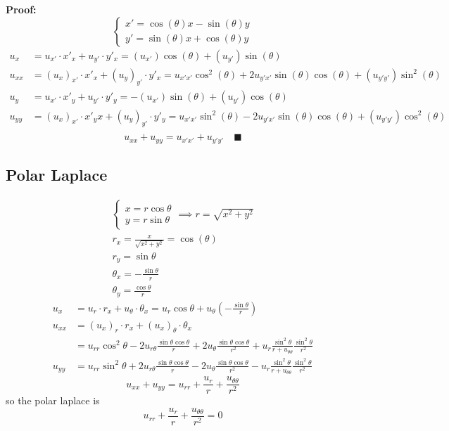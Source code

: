 \documentclass[10pt]{article}
\begin{document}
\textbf{Proof:} 
\[\begin{cases}
    x' = \cos(\theta)x - \sin(\theta) y\\
    y' = \sin(\theta)x + \cos(\theta)y
\end{cases}\]
\begin{align*}
    u_x &= u_{x'} \cdot x'_x + u_{y'} \cdot y'_x = (u_{x'})\cos(\theta) + (u_{y'})\sin(\theta)\\
    u_{xx} &= (u_x)_{x'}\cdot x'_x + (u_y)_{y'} \cdot y'_x = u_{x'x'}\cos^2(\theta) +2u_{y'x'}\sin(\theta)\cos(\theta) + (u_{y'y'})\sin^2(\theta)\\
    u_y &= u_{x'} \cdot x'_y + u_{y'} \cdot y'_y = -(u_{x'})\sin(\theta) + (u_{y'})\cos(\theta)\\
    u_{yy} &= (u_x)_{x'}\cdot x'_yx + (u_y)_{y'} \cdot y'_y = u_{x'x'}\sin^2(\theta) - 2u_{y'x'}\sin(\theta)\cos(\theta) + (u_{y'y'})\cos^2(\theta)\\
\end{align*}
\[u_{xx} + u_{yy} = u_{x'x'}+u_{y'y'}\quad \blacksquare\]

\subsection{Polar Laplace}
\begin{gather*}
    \begin{cases}
        x = r\cos \theta\\
        y = r\sin \theta
    \end{cases}\implies r = \sqrt{x^2 + y^2}\\
    r_x = \frac{x}{\sqrt{x^2 + y^2}} = \cos(\theta)\\
    r_y = \sin \theta\\
    \theta_x = -\frac{\sin \theta}{r}\\
    \theta_y = \frac{\cos \theta}{r}
\end{gather*}
\begin{align*}
    u_x &= u_r\cdot r_x + u_\theta \cdot \theta_x = u_r\cos\theta + u_\theta\left(-\frac{\sin \theta}{r}\right)\\
    u_{xx} &= (u_x)_r \cdot r_x + (u_x)_\theta \cdot \theta_x\\
    &= u_{rr}\cos^2\theta - 2u_{r\theta}\frac{\sin \theta \cos \theta}{r} + 2u_\theta \frac{\sin \theta \cos \theta}{r^2} + u_r \frac{\sin^2 \theta}{r + u_{\theta\theta}}\frac{\sin^2 \theta}{r^2}\\
    u_{yy} &= u_{rr}\sin^2\theta + 2u_{r\theta}\frac{\sin \theta \cos \theta}{r} - 2u_\theta \frac{\sin \theta \cos \theta}{r^2} - u_r \frac{\sin^2 \theta}{r + u_{\theta\theta}}\frac{\sin^2 \theta}{r^2}
\end{align*}
\[u_{xx}+u_{yy} = u_{rr} + \frac{u_r}{r} + \frac{u_{\theta\theta}}{r^2}\]
so the polar laplace is 
\[u_{rr} + \frac{u_r}{r} + \frac{u_{\theta\theta}}{r^2} = 0\]
\end{document}
